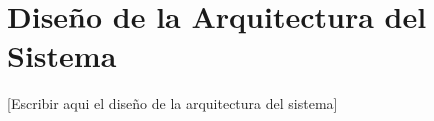 
\section{Diseño de la Arquitectura del Sistema}

[Escribir aqui el diseño de la arquitectura del sistema]
